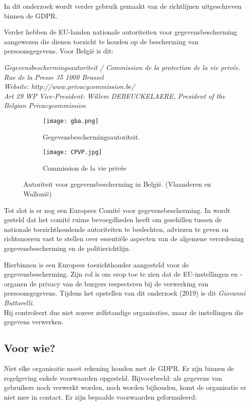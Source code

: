 In dit onderzoek wordt verder gebruik gemaakt van de richtlijnen uitgeschreven binnen de GDPR. 

Verder hebben de EU-landen nationale autoriteiten voor gegevensbescherming aangewezen die dienen toezicht te houden op de bescherming van persoonsgegevens. Voor België is dit: 

\quad \textit{Gegevensbeschermingsautoriteit / Commission de la protection de la vie privée. \\ \quad Rue de la Presse 35 1000 Brussel \\  \quad Website: http://www.privacycommission.be/ \\ 
    \quad Art 29 WP Vice-President: Willem DEBEUCKELAERE, President of the Belgian Privacycommission} 

\begin{figure}[h]
	\centering
	\begin{subfigure}{0.4\textwidth}
		\centering
		\texttt{[image: gba.png]}
		\caption{Gegevensbeschermingsautoriteit.}
	\end{subfigure}
	\begin{subfigure}{0.5\textwidth}
		\centering
		\texttt{[image: CPVP.jpg]}
		\caption{Commission de la vie privée}
	\end{subfigure}%
	\caption{Autoriteit voor gegevensbescherming in België. (Vlaanderen en Wallonië)}
\end{figure}

Tot slot is er nog een Europees Comité voor gegevensbescherming. In \textcite{Eucom2018} wordt gesteld dat het comité ruime bevoegdheden heeft om geschillen tussen de nationale toezichthoudende autoriteiten te beslechten, adviezen te geven en richtsnoeren vast te stellen over essentiële aspecten van de algemene verordening gegevensbescherming en de politierichtlijn.



Hierbinnen is een Europees toezichthouder aangesteld voor de gegevensbescherming. Zijn rol is om erop toe te zien dat de EU-instellingen en -organen de privacy van de burgers respecteren bij de verwerking van persoonsgegevens. Tijdens het opstellen van dit onderzoek (2019) is dit \textit{Giovanni Buttarelli}. 
\\ Hij controleert dus niet zozeer zelfstandige organisaties, maar de instellingen die gegevens verwerken. 


\subsection{Voor wie? }
Niet elke organisatie moet rekening houden met de GDPR. Er zijn binnen de regelgeving enkele voorwaarden opgesteld. Bijvoorbeeld: als gegevens van gebruikers noch verwerkt worden, noch worden bijhouden, komt de organisatie er niet mee in contact. 
Er zijn bepaalde voorwaarden geformuleerd: 

